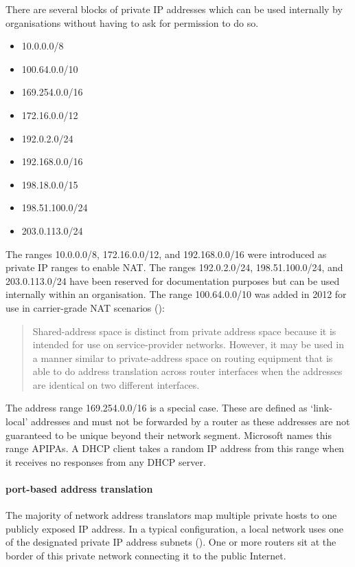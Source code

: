There are several blocks of private \acs{IP} addresses which can be used internally by organisations without having to ask for permission to do so.
\begin{multicols}{2}
\raggedcolumns
\begin{itemize}
\item 10.0.0.0/8
\item 100.64.0.0/10
\item 169.254.0.0/16
\item 172.16.0.0/12
\item 192.0.2.0/24
\item 192.168.0.0/16
\item 198.18.0.0/15
\item 198.51.100.0/24
\item 203.0.113.0/24
\end{itemize}
\end{multicols}

The ranges 10.0.0.0/8, 172.16.0.0/12, and 192.168.0.0/16 were introduced as private IP ranges to enable \acf{NAT}.
The ranges 192.0.2.0/24, 198.51.100.0/24, and 203.0.113.0/24 have been reserved for documentation purposes but can be used internally within an organisation.
The range 100.64.0.0/10 was added in 2012 for use in carrier-grade \ac{NAT} scenarios ():

\begin{quote}
Shared-address space is distinct from  private address space because it is intended for use on service-provider networks.
However, it may be used in a manner similar to  private-address space on routing equipment that is able to do address translation across router interfaces when the addresses are identical on two different interfaces.
\end{quote}

The address range 169.254.0.0/16 is a special case.
These are defined as `link-local' addresses and must not be forwarded by a router as these addresses are not guaranteed to be unique beyond their network segment.%
Microsoft names this range \acp{APIPA}.%
A \acs{DHCP} client takes a random \acs{IP} address from this range when it receives no responses from any \acs{DHCP} server.

\paragraph{port-based address translation}
The majority of network address translators map multiple private hosts to one publicly exposed \acs{IP} address.
In a typical configuration, a local network uses one of the designated private \acs{IP} address subnets ().
One or more routers sit at the border of this private network connecting it to the public Internet.

